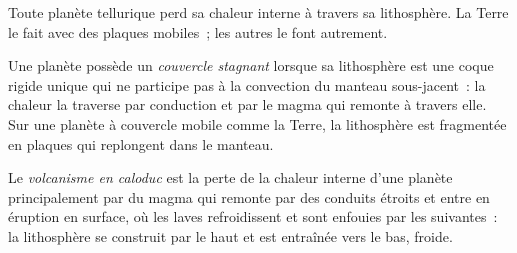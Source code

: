 Toute planète tellurique perd sa chaleur interne à travers sa lithosphère.
La Terre le fait avec des plaques mobiles~; les autres le font autrement.

\begin{definition}\label{def:b3:planetary-interiors-surfaces:stagnant-lid}
Une planète possède un \emph{couvercle stagnant} lorsque sa lithosphère
est une coque rigide unique qui ne participe pas à la convection du
manteau sous-jacent~: la chaleur la traverse par conduction et par le magma qui remonte
à travers elle. Sur une planète à couvercle mobile comme la Terre, la lithosphère est
fragmentée en plaques qui replongent dans le manteau.
\end{definition}

\begin{definition}\label{def:b3:planetary-interiors-surfaces:heat-pipe}
Le \emph{volcanisme en caloduc} est la perte de la chaleur interne
d'une planète principalement par du magma qui remonte par des conduits étroits
et entre en éruption en surface, où les laves refroidissent et sont enfouies par les
suivantes~: la lithosphère se construit par le haut et est entraînée vers le bas, froide.
\end{definition}

